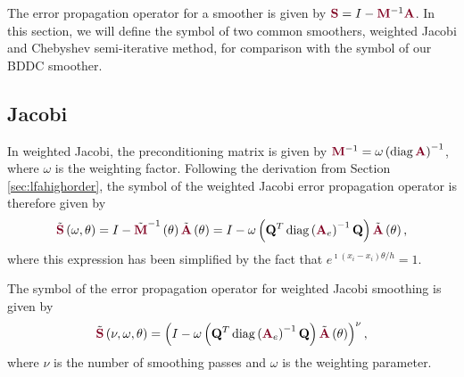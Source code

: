 The error propagation operator for a smoother is given by ${\color{burgundy}\mathbf{S}} = I - {\color{burgundy}\mathbf{M}}^{-1} {\color{burgundy}\mathbf{A}}$.
In this section, we will define the symbol of two common smoothers, weighted Jacobi and Chebyshev semi-iterative method, for comparison with the symbol of our BDDC smoother.

\subsection{Jacobi}

In weighted Jacobi, the preconditioning matrix is given by ${\color{burgundy}\mathbf{M}}^{-1} = \omega \left( \diag {\color{burgundy}\mathbf{A}} \right)^{-1}$, where $\omega$ is the weighting factor.
Following the derivation from Section \ref{sec:lfahighorder}, the symbol of the weighted Jacobi error propagation operator is therefore given by
\begin{equation}
\tilde{{\color{burgundy}\mathbf{S}}} \left( \omega, \theta \right) = I - \tilde{{\color{burgundy}\mathbf{M}}}^{-1} \left( \theta \right) \tilde{{\color{burgundy}\mathbf{A}}} \left( \theta \right) = I - \omega \left( \mathbf{Q}^T \diag \left( {\color{burgundy}\mathbf{A}}_e \right)^{-1} \mathbf{Q} \right) \tilde{{\color{burgundy}\mathbf{A}}} \left( \theta \right),
\end{equation}
where this expression has been simplified by the fact that $e^{\imath \left( x_i - x_i \right) \theta / h} = 1$.

\begin{definition}
The symbol of the error propagation operator for weighted Jacobi smoothing is given by
\begin{equation}
\tilde{{\color{burgundy}\mathbf{S}}} \left( \nu, \omega, \theta \right) = \left( I - \omega \left( \mathbf{Q}^T \diag \left( {\color{burgundy}\mathbf{A}}_e \right)^{-1} \mathbf{Q} \right) \tilde{{\color{burgundy}\mathbf{A}}} \left( \theta \right) \right)^\nu,
\end{equation}
where $\nu$ is the number of smoothing passes and $\omega$ is the weighting parameter.
\label{def:jacobi_symbol}
\end{definition}

